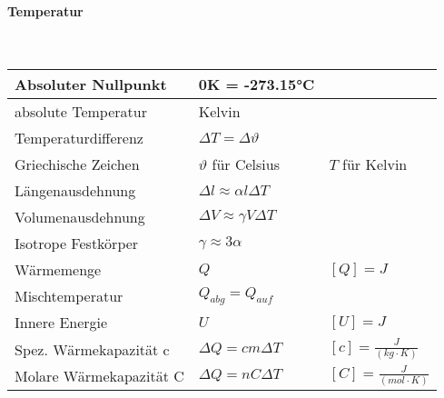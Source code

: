 \paragraph{Temperatur}\mbox{}\\
\noindent
\begin{tabularx}{\columnwidth}{@{}XXX@{}}
	Absoluter Nullpunkt                    & 0K = -273.15°C                                                                                              \\ \hline
	absolute Temperatur                    & Kelvin                                                                                                      \\ \hline
	Temperaturdifferenz                    & $\Delta T = \Delta \vartheta$                                                                               \\ \hline
	Griechische Zeichen                    & $\vartheta$ für Celsius                              & $T$ für Kelvin                                       \\ \hline
	Längenausdehnung                       & $\Delta l \approx \alpha l \Delta T$                                                                        \\ \hline
	Volumenausdehnung                      & $\Delta V \approx \gamma V \Delta T$                                                                        \\ \hline
	Isotrope Festkörper                    & $\gamma \approx 3\alpha$                                                                                    \\ \hline
	Wärmemenge                             & $Q$                                                  & $[Q] = J$                                            \\ \hline
	Mischtemperatur						   & $ Q_{abg} = Q_{auf} $ \\ \hline
	Innere Energie                         & $U$                                                  & $[U] = J$                                            \\ \hline
	Spez. Wärmekapazität c                 & $\Delta Q = cm\Delta T$                              & $[c] = \frac{J}{(kg\cdot K)}$                        \\ \hline
	Molare Wärmekapazität C                & $\Delta Q = nC\Delta T$                              & $[C] = \frac{J}{(mol\cdot K)}$                       \\ \hline

\end{tabularx}

